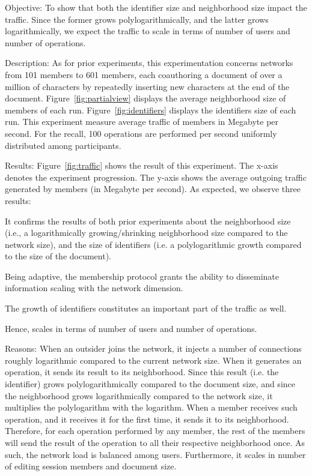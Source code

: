 \begin{asparadesc}
\item [Objective:] To show that both the identifier size and neighborhood size
  impact the traffic. Since the former grows polylogarithmically, and the latter
  grows logarithmically, we expect the traffic to scale in terms of number of
  users and number of operations.
\item [Description:] As for prior experiments, this experimentation concerns
  networks from 101 members to 601 members, each coauthoring a document of over
  a million of characters by repeatedly inserting new characters at the end of
  the document. Figure~\ref{fig:partialview} displays the average neighborhood
  size of members of each run. Figure~\ref{fig:identifiers} displays the
  identifiers size of each run. This experiment measure average traffic of
  members in Megabyte per second. For the recall, 100 operations are performed
  per second uniformly distributed among participants.
\item [Results:] Figure~\ref{fig:traffic} shows the result of this experiment.
  The x-axis denotes the experiment progression. The y-axis shows the average
  outgoing traffic generated by members (in Megabyte per second). As expected,
  we observe three results:
  \begin{inparaenum}[(i)]
  \item It confirms the results of both prior experiments about the neighborhood
    size (i.e., a logarithmically growing/shrinking neighborhood size compared
    to the network size), and the size of identifiers (i.e. a
    polylogarithmic growth compared to the size of the document).
  \item Being adaptive, the \SPRAY membership protocol grants the ability to
    disseminate information scaling with the network dimension.
  \item The growth of identifiers constitutes an important part of the traffic
    as well.
  \end{inparaenum}
  Hence, \CRATE scales in terms of number of users and number of operations.
\item [Reasons:] When an outsider joins the network, it injects a number of
  connections roughly logarithmic compared to the current network size. When it
  generates an operation, it sends its result to its neighborhood. Since this
  result (i.e. the identifier) grows polylogarithmically compared to the
  document size, and since the neighborhood grows logarithmically compared to
  the network size, it multiplies the polylogarithm with the logarithm. When a
  member receives such operation, and it receives it for the first time, it
  sends it to its neighborhood. Therefore, for each operation performed by any
  member, the rest of the members will send the result of the operation to all
  their respective neighborhood once. As such, the network load is balanced
  among users. Furthermore, it scales in number of editing session members and
  document size.
\end{asparadesc}

